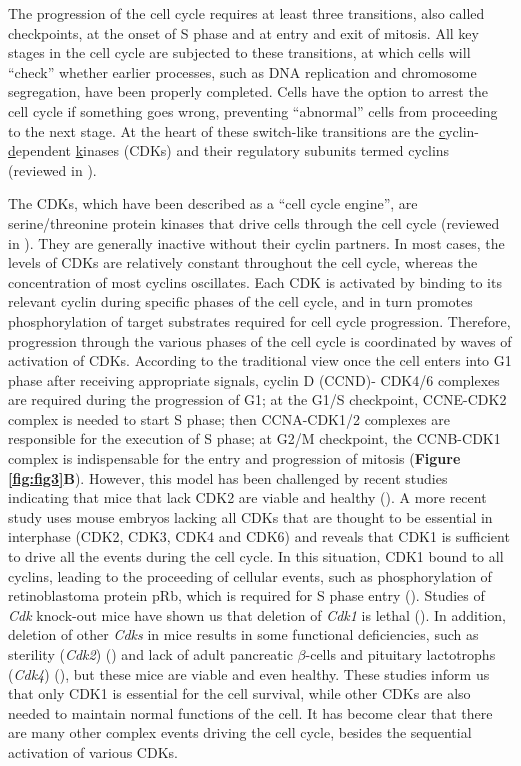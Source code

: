 The progression of the cell cycle requires at least three transitions, also called checkpoints, at the onset of S phase and at entry and exit of mitosis. All key stages in the cell cycle are subjected to these transitions, at which cells will \enquote{check} whether earlier processes, such as DNA replication and chromosome segregation, have been properly completed. Cells have the option to arrest the cell cycle if something goes wrong, preventing \enquote{abnormal} cells from proceeding to the next stage. At the heart of these switch-like transitions are the \underline{c}yclin-\underline{d}ependent \underline{k}inases (CDKs) and their regulatory subunits termed cyclins (reviewed in \cite{nurse2000a,hochegger2008cyclin-dependent}).

The CDKs, which have been described as a \enquote{cell cycle engine}, are serine/threonine protein kinases that drive cells through the cell cycle (reviewed in \cite{ds}). They are generally inactive without their cyclin partners. In most cases, the levels of CDKs are relatively constant throughout the cell cycle, whereas the concentration of most cyclins oscillates. Each CDK is activated by binding to its relevant cyclin during specific phases of the cell cycle, and in turn promotes phosphorylation of target substrates required for cell cycle progression. Therefore, progression through the various phases of the cell cycle is coordinated by waves of activation of CDKs. According to the traditional view once the cell enters into G1 phase after receiving appropriate signals, cyclin D (CCND)- CDK4/6 complexes are required during the progression of G1; at the G1/S checkpoint, CCNE-CDK2 complex is needed to start S phase; then CCNA-CDK1/2 complexes are responsible for the execution of S phase; at G2/M checkpoint, the CCNB-CDK1 complex is indispensable for the entry and progression of mitosis (\textbf{Figure \ref{fig:fig3}B}). However, this model has been challenged by recent studies indicating that mice that lack CDK2 are viable and healthy (\cite{ortega2003cyclin-dependent,berthet2003cdk2}). A more recent study uses mouse embryos lacking all CDKs that are thought to be essential in interphase (CDK2, CDK3, CDK4 and CDK6) and reveals that CDK1 is sufficient to drive all the events during the cell cycle. In this situation, CDK1 bound to all cyclins, leading to the proceeding of cellular events, such as phosphorylation of retinoblastoma protein pRb, which is required for S phase entry (\cite{santamaría2007cdk1}). Studies of \textit{Cdk} knock-out mice have shown us that deletion of \textit{Cdk1} is lethal (\cite{santamaría2007cdk1}). In addition, deletion of other \textit{Cdks} in mice results in some functional deficiencies, such as sterility (\textit{Cdk2}) (\cite{ortega2003cyclin-dependent,berthet2003cdk2}) and lack of adult pancreatic $\beta$-cells and pituitary lactotrophs (\textit{Cdk4}) (\cite{rane1999loss}), but these mice are viable and even healthy. These studies inform us that only CDK1 is essential for the cell survival, while other CDKs are also needed to maintain normal functions of the cell. It has become clear that there are many other complex events driving the cell cycle, besides the sequential activation of various CDKs.

